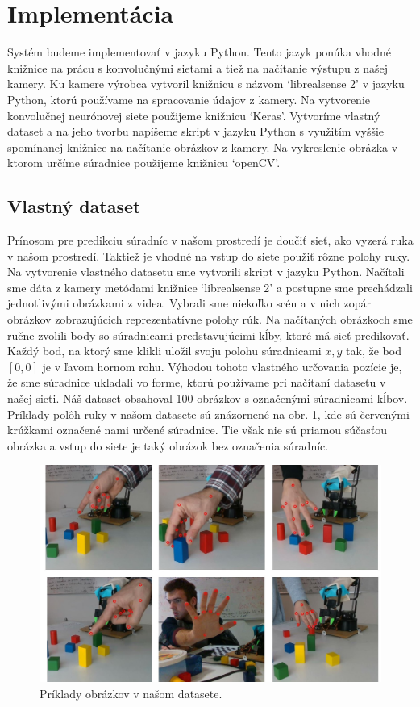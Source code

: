 \section{Implementácia}\label{sec:implementation}
Systém budeme implementovať v jazyku Python. Tento jazyk ponúka vhodné knižnice na prácu s konvolučnými sieťami a tiež na načítanie výstupu z našej kamery. Ku kamere výrobca vytvoril knižnicu s názvom `librealsense 2' v jazyku Python, ktorú používame na spracovanie údajov z kamery. Na vytvorenie konvolučnej neurónovej siete použijeme knižnicu `Keras'. Vytvoríme vlastný dataset a na jeho tvorbu napíšeme skript v jazyku Python s využitím vyššie spomínanej knižnice na načítanie obrázkov z kamery. Na vykreslenie obrázka v ktorom určíme súradnice použijeme knižnicu `openCV'.

\subsection{Vlastný dataset}
Prínosom pre predikciu súradníc v našom prostredí je doučiť sieť, ako vyzerá ruka v našom prostredí. Taktiež je vhodné na vstup do siete použiť rôzne polohy ruky. Na vytvorenie vlastného datasetu sme vytvorili skript v jazyku Python. Načítali sme dáta z kamery metódami knižnice `librealsense 2' a postupne sme prechádzali jednotlivými obrázkami z videa. Vybrali sme niekoľko scén a v nich zopár obrázkov zobrazujúcich reprezentatívne polohy rúk. Na načítaných obrázkoch sme ručne zvolili body so súradnicami predstavujúcimi kĺby, ktoré má sieť predikovať. Každý bod, na ktorý sme klikli uložil svoju polohu súradnicami $x, y$ tak, že bod $\left[0, 0\right]$ je v ľavom hornom rohu. Výhodou tohoto vlastného určovania pozície je, že sme súradnice ukladali vo forme, ktorú používame pri načítaní datasetu v našej sieti. Náš dataset obsahoval 100 obrázkov s označenými súradnicami kĺbov. Príklady polôh ruky v našom datasete sú znázornené na obr. \ref{img:our_hands}, kde sú červenými krúžkami označené nami určené súradnice. Tie však nie sú priamou súčasťou obrázka a vstup do siete je taký obrázok bez označenia súradníc.

\begin{figure}[H]
	\begin{center}
		\includegraphics[width=\textwidth]{images/our_hands.jpg}
		\caption{Príklady obrázkov v našom  datasete.}
		\label{img:our_hands}
	\end{center}
\end{figure}

